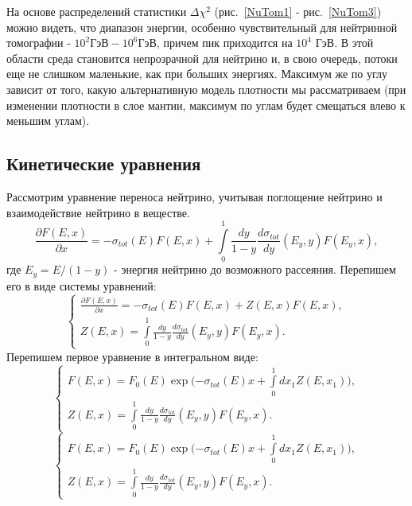 На основе распределений статистики $\Delta\chi^2$ (рис.~\ref{NuTom1} - рис.~\ref{NuTom3}) можно видеть, что диапазон энергии, особенно чувствительный для нейтринной томографии  - $10^2 \text{ГэВ}-10^6 \text{ГэВ}$, причем пик приходится на $10^4 \text{ ГэВ}$. В этой области среда становится непрозрачной для нейтрино и, в свою очередь, потоки еще не слишком маленькие, как при больших энергиях. Максимум же по углу зависит от того, какую альтернативную модель плотности мы рассматриваем (при изменении плотности в слое мантии, максимум по углам будет смещаться влево к меньшим углам). 
\subsection{Кинетические уравнения}
Рассмотрим уравнение переноса нейтрино, учитывая поглощение нейтрино и взаимодействие нейтрино в веществе.
\begin{equation}
    \frac{\partial F(E, x)}{\partial x} = -\sigma_{tot}(E)F(E, x) + \int\limits_{0}^1\frac{dy}{1-y}\frac{d\sigma_{tot}}{dy}(E_y, y)F(E_y, x), 
\end{equation}
где $E_y = E/(1-y)$ - энергия нейтрино до возможного рассеяния. Перепишем его в виде системы уравнений:
\begin{equation}
    \begin{cases}
         \frac{\partial F(E, x)}{\partial x} = -\sigma_{tot}(E)F(E, x) + Z(E, x)F(E, x),\\
          Z(E, x) = \int\limits_{0}^1\frac{dy}{1-y}\frac{d\sigma_{tot}}{dy}(E_y, y)F(E_y, x).
    \end{cases}
\end{equation}
Перепишем первое уравнение в интегральном виде:
\begin{equation}
    \begin{cases}
          F(E, x) = F_0(E)\exp{(-\sigma_{tot}(E)x + \int\limits_{0}^1dx_1Z(E, x_1)}),\\
          Z(E, x) = \int\limits_{0}^1\frac{dy}{1-y}\frac{d\sigma_{tot}}{dy}(E_y, y)F(E_y, x).
    \end{cases}
\end{equation}
\begin{equation}
    \begin{cases}
          F(E, x) = F_0(E)\exp{(-\sigma_{tot}(E)x + \int\limits_{0}^1dx_1Z(E, x_1)}),\\
          Z(E, x) = \int\limits_{0}^1\frac{dy}{1-y}\frac{d\sigma_{tot}}{dy}(E_y, y)F(E_y, x).
    \end{cases}
\end{equation}
